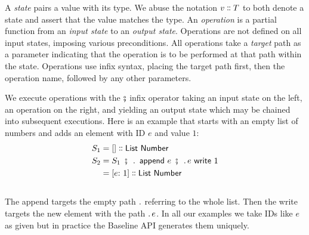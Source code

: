 \documentclass[english,submission]{programming}
\theoremstyle{definition}
\newcommand{\mathbox}[1]{\colorbox{black!10}{$#1$\phantom{i\hspace{-3.5pt}}}}
\DeclareMathOperator{\exec}{\ \fatsemi\ \ }
\newcommand{\is}{{:}\ }
\newcommand{\isa}{\dblcolon}
\begin{document}
A \textit{state} pairs a value with its type. We abuse the notation \mathbox{v \isa T} to both denote a state and assert that the value matches the type.
An \textit{operation} is a partial function from an \textit{input state} to an \textit{output state}. Operations are not defined on all input states, imposing various preconditions.
All operations take a \textit{target} path as a parameter indicating that the operation is to be performed at that path within the state.
Operations use infix syntax, placing the target path first, then the operation name, followed by any other parameters.




We execute operations with the \mathbox{\fatsemi} infix operator taking an input state on the left, an operation on the right, and yielding an output state which may be chained into subsequent executions. Here is an example that starts with an empty list of numbers and adds an element with ID $e$ and value $1$:
\begin{align*}
  S_1 &= [] \isa \textsf{List Number}\\
  S_2 &= S_1 \exec \ldotp \textsf{ append } e \exec \ldotp e \textsf{ write } 1\\
  &= [e \is 1] \isa \textsf{List Number}\\
\end{align*}
\vspace{-30pt}\\
The \textsf{append} targets the empty path \mathbox{\ldotp} referring to the whole list. Then the \textsf{write} targets the new element with the path \mathbox{\ldotp e}. In all our examples we take IDs like \mathbox{e} as given but in practice the Baseline API generates them uniquely.
\end{document}
